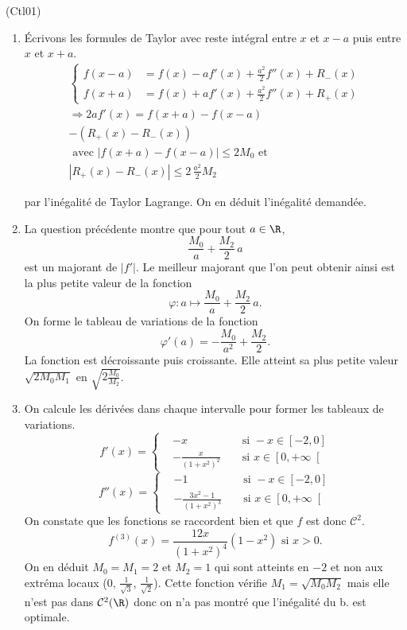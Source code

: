 \begin{tiny}(Ctl01)\end{tiny}
\begin{enumerate}
  \item \'Ecrivons les formules de Taylor avec reste intégral entre $x$ et $x-a$ puis entre $x$ et $x+a$.
\begin{multline*}
\left\lbrace
  \begin{aligned}
f(x-a) &= f(x) - af'(x) + \frac{a^2}{2}f''(x) + R_-(x) \\ 
f(x+a) &= f(x) + af'(x) + \frac{a^2}{2}f''(x) + R_+(x)
  \end{aligned}
\right. \\
\Rightarrow 
2af'(x) = f(x+a) - f(x-a) \\
-\left(R_+(x) - R_-(x)\right)\\
\text{ avec } \left| f(x+a) - f(x-a)\right| \leq 2 M_0 
\text{ et }\\
\left|R_+(x) - R_-(x)\right| \leq 2 \, \frac{a^2}{2}M_2
\end{multline*}

par l'inégalité de Taylor Lagrange. On en déduit l'inégalité demandée.

  \item La question précédente montre que pour tout $a \in \R$, 
\[
  \frac{M_0}{a} + \frac{M_2}{2}\, a
\]
est un majorant de $|f'|$. Le meilleur majorant que l'on peut obtenir ainsi est la plus petite valeur de la fonction
\[
  \varphi : a \mapsto \frac{M_0}{a} + \frac{M_2}{2}\, a.
\]
On forme le tableau de variations de la fonction
\[
  \varphi'(a) = -\frac{M_0}{a^2} + \frac{M_2}{2}.
\]
La fonction est décroissante puis croissante. Elle atteint sa plus petite valeur $\sqrt{2 M_0 M_1}$ en $\sqrt{2\frac{M_0} {M_2}}$.

  \item On calcule les dérivées dans chaque intervalle pour former les tableaux de variations.
\[
  f'(x) = 
  \left\lbrace
  \begin{aligned}
   & -x &&\text{ si } -x \in \left[-2,0\right] \\
   & -\frac{x}{(1+x^2)^2} &&\text{ si } x \in \left[0, +\infty\right[ 
  \end{aligned}
\right.
\]
\[
  f''(x) = 
  \left\lbrace
  \begin{aligned}
   & -1 &&\text{ si } -x \in \left[-2,0\right] \\
   & -\frac{3x^2-1}{(1+x^2)^3} &&\text{ si } x \in \left[0, +\infty\right[ 
  \end{aligned}
\right.
\]
On constate que les fonctions se raccordent bien et que $f$ est donc $\mathcal{C}^2$.
\[
  f^{(3)}(x) = \frac{12x}{(1+x^2)^4}(1-x^2)\text{ si } x>0.
\]
On en déduit $M_0 = M_1 = 2$ et $M_2=1$ qui sont atteints en $-2$ et non aux extréma locaux ($0$, $\frac{1}{\sqrt{3}}$, $\frac{1}{\sqrt{2}}$). Cette fonction vérifie $M_1 = \sqrt{M_0 M_2}$ mais elle n'est pas dans $\mathcal{C}^2(\R)$ donc on n'a pas montré que l'inégalité du b. est optimale. 
\end{enumerate}
